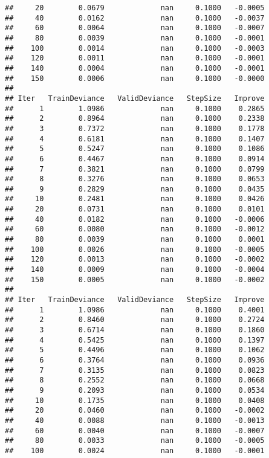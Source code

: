 \documentclass[
]{article}
\begin{document}
\begin{verbatim}
##     20        0.0679             nan     0.1000   -0.0005
##     40        0.0162             nan     0.1000   -0.0037
##     60        0.0064             nan     0.1000   -0.0007
##     80        0.0039             nan     0.1000   -0.0001
##    100        0.0014             nan     0.1000   -0.0003
##    120        0.0011             nan     0.1000   -0.0001
##    140        0.0004             nan     0.1000   -0.0001
##    150        0.0006             nan     0.1000   -0.0000
## 
## Iter   TrainDeviance   ValidDeviance   StepSize   Improve
##      1        1.0986             nan     0.1000    0.2865
##      2        0.8964             nan     0.1000    0.2338
##      3        0.7372             nan     0.1000    0.1778
##      4        0.6181             nan     0.1000    0.1407
##      5        0.5247             nan     0.1000    0.1086
##      6        0.4467             nan     0.1000    0.0914
##      7        0.3821             nan     0.1000    0.0799
##      8        0.3276             nan     0.1000    0.0653
##      9        0.2829             nan     0.1000    0.0435
##     10        0.2481             nan     0.1000    0.0426
##     20        0.0731             nan     0.1000    0.0101
##     40        0.0182             nan     0.1000   -0.0006
##     60        0.0080             nan     0.1000   -0.0012
##     80        0.0039             nan     0.1000    0.0001
##    100        0.0026             nan     0.1000   -0.0005
##    120        0.0013             nan     0.1000   -0.0002
##    140        0.0009             nan     0.1000   -0.0004
##    150        0.0005             nan     0.1000   -0.0002
## 
## Iter   TrainDeviance   ValidDeviance   StepSize   Improve
##      1        1.0986             nan     0.1000    0.4001
##      2        0.8460             nan     0.1000    0.2724
##      3        0.6714             nan     0.1000    0.1860
##      4        0.5425             nan     0.1000    0.1397
##      5        0.4496             nan     0.1000    0.1062
##      6        0.3764             nan     0.1000    0.0936
##      7        0.3135             nan     0.1000    0.0823
##      8        0.2552             nan     0.1000    0.0668
##      9        0.2093             nan     0.1000    0.0534
##     10        0.1735             nan     0.1000    0.0408
##     20        0.0460             nan     0.1000   -0.0002
##     40        0.0088             nan     0.1000   -0.0013
##     60        0.0040             nan     0.1000   -0.0007
##     80        0.0033             nan     0.1000   -0.0005
##    100        0.0024             nan     0.1000   -0.0001

\end{verbatim}
\end{document}

